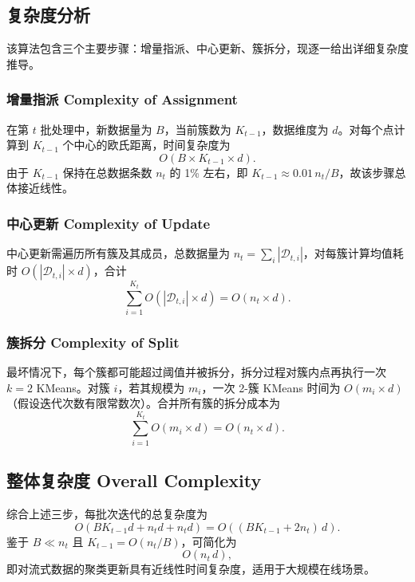 \documentclass[12pt]{article}  %
\begin{document}
\subsection{复杂度分析}
该算法包含三个主要步骤：增量指派、中心更新、簇拆分，现逐一给出详细复杂度推导。

\subsubsection{增量指派 Complexity of Assignment}
在第 $t$ 批处理中，新数据量为 $B$，当前簇数为 $K_{t-1}$，数据维度为 $d$。对每个点计算到 $K_{t-1}$ 个中心的欧氏距离，时间复杂度为
\[
O\left(B \times K_{t-1} \times d\right).
\]
由于 $K_{t-1}$ 保持在总数据条数 $n_t$ 的 1\% 左右，即 $K_{t-1}\approx 0.01\,n_t/B$，故该步骤总体接近线性。

\subsubsection{中心更新 Complexity of Update}
中心更新需遍历所有簇及其成员，总数据量为 $n_t=\sum_i|\mathcal{D}_{t,i}|$，对每簇计算均值耗时 $O(|\mathcal{D}_{t,i}|\times d)$，合计
\[
\sum_{i=1}^{K_t}O\left(|\mathcal{D}_{t,i}|\times d\right)
=O\left(n_t\times d\right).
\]

\subsubsection{簇拆分 Complexity of Split}
最坏情况下，每个簇都可能超过阈值并被拆分，拆分过程对簇内点再执行一次 $k=2$ KMeans。对簇 $i$，若其规模为 $m_i$，一次 2-簇 KMeans 时间为 $O(m_i\times d)$（假设迭代次数有限常数次）。合并所有簇的拆分成本为
\[
\sum_{i=1}^{K_t}O\left(m_i\times d\right)
=O\left(n_t\times d\right).
\]

\subsection{整体复杂度 Overall Complexity}
综合上述三步，每批次迭代的总复杂度为
\[
O\left(BK_{t-1}d + n_t d + n_t d\right)
=O\left((B K_{t-1} + 2 n_t)\,d\right).
\]
鉴于 $B\ll n_t$ 且 $K_{t-1}=O(n_t/B)$，可简化为
\[
O\left(n_t\,d\right),
\]
即对流式数据的聚类更新具有近线性时间复杂度，适用于大规模在线场景。
\end{document}
